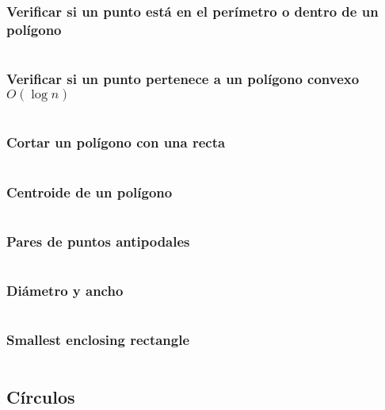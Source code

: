 \documentclass[11pt]{article}
\begin{document}
			\subsubsection{Verificar si un punto está en el perímetro o dentro de un polígono}
			\inputminted[tabsize=2,breaklines,firstline=171,lastline=195,fontsize=\small]{c++}{geometry.cpp}
			
			\subsubsection{Verificar si un punto pertenece a un polígono convexo $O(\log n)$}
			\inputminted[tabsize=2,breaklines,firstline=197,lastline=220,fontsize=\small]{c++}{geometry.cpp}
			
			\subsubsection{Cortar un polígono con una recta}
			\inputminted[tabsize=2,breaklines,firstline=226,lastline=242,fontsize=\small]{c++}{geometry.cpp}
			
			\subsubsection{Centroide de un polígono}
			\inputminted[tabsize=2,breaklines,firstline=259,lastline=269,fontsize=\small]{c++}{geometry.cpp}
			
			\subsubsection{Pares de puntos antipodales}
			\inputminted[tabsize=2,breaklines,firstline=271,lastline=282,fontsize=\small]{c++}{geometry.cpp}
			
			\subsubsection{Diámetro y ancho}
			\inputminted[tabsize=2,breaklines,firstline=284,lastline=298,fontsize=\small]{c++}{geometry.cpp}
			
			\subsubsection{Smallest enclosing rectangle}
			\inputminted[tabsize=2,breaklines,firstline=300,lastline=319,fontsize=\small]{c++}{geometry.cpp}
		
		\subsection{Círculos}
\end{document}
